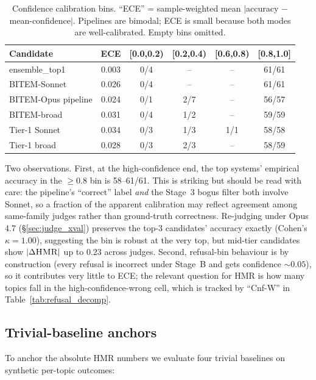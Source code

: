 \documentclass[11pt,a4paper]{article}
\newcommand{\HMR}{\textsc{HMR}}
\begin{document}
\begin{table}[h]
\centering
\caption{Confidence calibration bins. ``ECE'' = sample-weighted mean
$|$accuracy $-$ mean-confidence$|$. Pipelines are bimodal; ECE is small
because both modes are well-calibrated. Empty bins omitted.}
\label{tab:calibration}
\small
\begin{tabular}{lccccc}
\toprule
Candidate & ECE & {[}0.0,0.2{)} & {[}0.2,0.4{)} & {[}0.6,0.8{)} & {[}0.8,1.0{]} \\
\midrule
ensemble\_top1     & 0.003 & 0/4   & --     & --     & 61/61 \\
BITEM-Sonnet       & 0.026 & 0/4   & --     & --     & 61/61 \\
BITEM-Opus pipeline& 0.024 & 0/1   & 2/7    & --     & 56/57 \\
BITEM-broad        & 0.031 & 0/4   & 1/2    & --     & 59/59 \\
Tier-1 Sonnet      & 0.034 & 0/3   & 1/3    & 1/1    & 58/58 \\
Tier-1 broad       & 0.028 & 0/3   & 2/3    & --     & 58/59 \\
\bottomrule
\end{tabular}
\end{table}

\noindent Two observations. First, at the high-confidence end, the
top systems' empirical accuracy in the $\geq 0.8$ bin is 58–61/61.
This is striking but should be read with care: the pipeline's
``correct'' label \emph{and} the Stage~3 bogus filter both involve
Sonnet, so a fraction of the apparent calibration may reflect
agreement among same-family judges rather than ground-truth
correctness. Re-judging under Opus 4.7
(\S\ref{sec:judge_xval}) preserves the top-3 candidates' accuracy
exactly (Cohen's $\kappa = 1.00$), suggesting the bin is robust at
the very top, but mid-tier candidates show $|\Delta\HMR|$ up to
$0.23$ across judges. Second, refusal-bin behaviour is by
construction (every refusal is incorrect under Stage~B and gets
confidence $\sim 0.05$), so it contributes very little to ECE;
the relevant question for HMR is how many topics fall in the
high-confidence-wrong cell, which is tracked by ``Cnf-W'' in
Table~\ref{tab:refusal_decomp}.

\subsection{Trivial-baseline anchors}

To anchor the absolute \HMR{} numbers we evaluate four trivial
baselines on synthetic per-topic outcomes:
\end{document}

